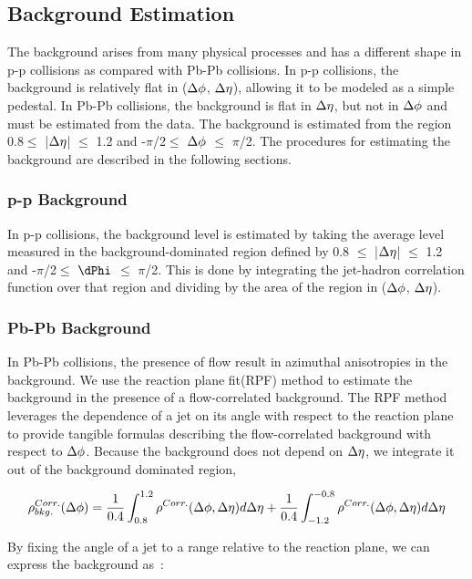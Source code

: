 \subsection*{Background Estimation}

The background arises from many physical processes and has a different shape in p-p collisions as compared with Pb-Pb collisions. In p-p collisions, the background is relatively flat in ($\Delta \phi$, $\Delta \eta$), allowing it to be modeled as a simple pedestal. In Pb-Pb collisions, the background is flat in $\Delta \eta$, but not in $\Delta \phi$ and must be estimated from the data. The background is estimated from the region 0.8$\leq$ |$\Delta \eta$| $\leq$ 1.2 and -$\pi$/2$\leq$ $\Delta \phi$ $\leq$ $\pi$/2. The procedures for estimating the background are described in the following sections.

\subsubsection*{p-p Background}

In p-p collisions, the background level is estimated by taking the average level measured in the background-dominated region defined by 0.8 $\leq$ |$\Delta \eta$| $\leq$ 1.2 and -$\pi$/2$\leq$ $\dPhi$ $\leq$ $\pi$/2. This is done by integrating the jet-hadron correlation function over that region and dividing by the area of the region in ($\Delta \phi$, $\Delta \eta$). 

\subsubsection{Pb-Pb Background}

In Pb-Pb collisions, the presence of flow result in azimuthal anisotropies in the background. We use the reaction plane fit(RPF) method to estimate the background in the presence of a flow-correlated background. The RPF method leverages the dependence of a jet on its angle with respect to the reaction plane to provide tangible formulas describing the flow-correlated background with respect to $\Delta \phi$. Because the background does not depend on $\Delta \eta$, we integrate it out of the background dominated region,

\begin{equation}
    \rho_{bkg.}^{Corr.}(\Delta \phi) = \frac{1}{0.4}\int_{0.8}^{1.2}\rho^{Corr.}(\Delta \phi, \Delta \eta) d\Delta \eta + \frac{1}{0.4}\int_{-1.2}^{-0.8}\rho^{Corr.}(\Delta \phi, \Delta \eta) d\Delta \eta
\end{equation}

By fixing the angle of a jet to a range relative to the reaction plane, we can express the background as~\cite{RPF,RPF2}:

